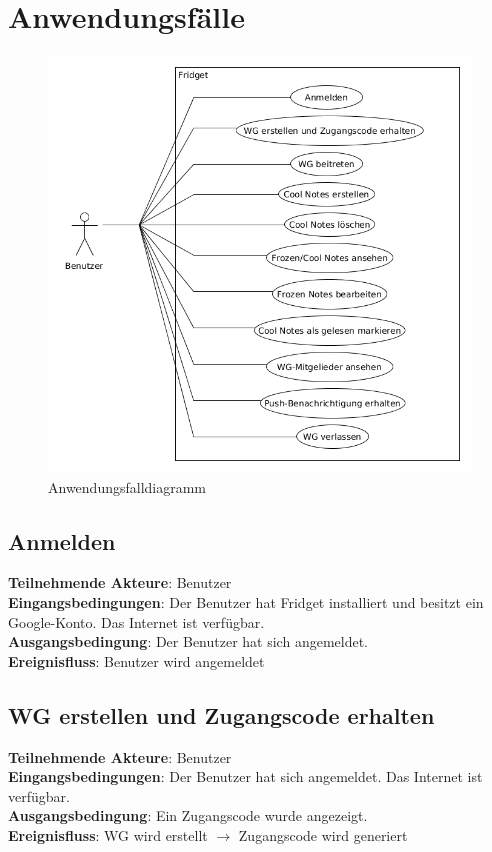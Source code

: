 \documentclass[a4paper]{scrreprt}
\begin{document}
    \chapter{Anwendungsfälle}
    		\begin{figure}[h]
			\centering
			\includegraphics[scale = .6]{anwendungsfalldiagramm.png}
			\caption{Anwendungsfalldiagramm}
		\end{figure}
    		    		
        \section{Anmelden}
        \textbf{Teilnehmende Akteure}: Benutzer \\
		\textbf{Eingangsbedingungen}: Der Benutzer hat Fridget installiert und besitzt ein Google-Konto. Das Internet ist verfügbar. \\
		\textbf{Ausgangsbedingung}: Der Benutzer hat sich angemeldet. \\
		\textbf{Ereignisfluss}: Benutzer wird angemeldet
		
		\section{WG erstellen und Zugangscode erhalten}
		\textbf{Teilnehmende Akteure}: Benutzer \\
		\textbf{Eingangsbedingungen}: Der Benutzer hat sich angemeldet. Das Internet ist verfügbar. \\
		\textbf{Ausgangsbedingung}: Ein Zugangscode wurde angezeigt. \\
		\textbf{Ereignisfluss}: WG wird erstellt $\rightarrow$ Zugangscode wird generiert
		
\end{document}

